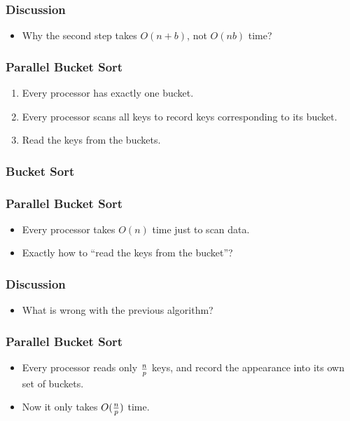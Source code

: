 \documentclass{beamer}
\begin{document}
\begin{CJK}{UTF8}{bsmi}
\begin{frame}
\frametitle{Discussion}
\begin{itemize}
\item Why the second step takes $O(n + b)$, not $O(n b)$ time?
\end{itemize}
\end{frame}

\begin{frame}
\frametitle{Parallel Bucket Sort}
\begin{enumerate}
\item Every processor has exactly one bucket.
\item Every processor scans all keys to record keys corresponding to
  its bucket.
\item Read the keys from the buckets.
\end{enumerate}
\end{frame}


\begin{frame}
\frametitle{Bucket Sort}
\centerline{}
\end{frame}

\begin{frame}
\frametitle{Parallel Bucket Sort}
\begin{itemize}
\item Every processor takes $O(n)$ time just to scan data.
\item Exactly how to ``read the keys from the bucket''?
\end{itemize}
\end{frame}

\begin{frame}
\frametitle{Discussion}
\begin{itemize}
\item What is wrong with the previous algorithm?
\end{itemize}
\end{frame}


\begin{frame}
\frametitle{Parallel Bucket Sort}
\begin{itemize}
\item Every processor reads only $n \over p$ keys, and record the
  appearance into its own set of buckets.
\item Now it only takes $O({n \over p})$ time.
\end{itemize}
\end{frame}


\end{CJK}
\end{document}
